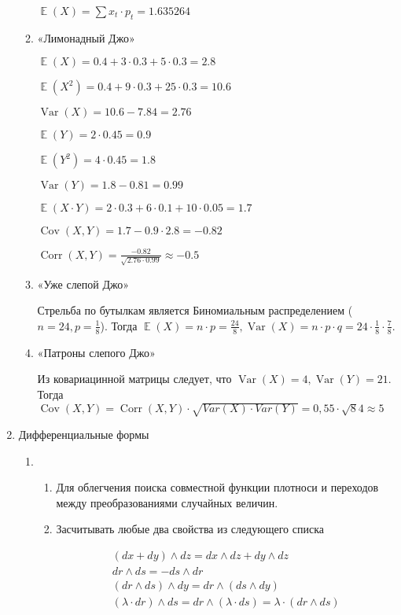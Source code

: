 \documentclass[11pt, a4paper]{article}
\DeclareMathOperator{\Var}{Var}
\DeclareMathOperator{\Cov}{Cov}
\DeclareMathOperator{\Corr}{Corr}
\DeclareMathOperator{\E}{\mathbb{E}}
\theoremstyle{definition}
\begin{document}
\begin{enumerate}
\begin{enumerate}
	$\E(X) = \sum x_t \cdot p_t = 1.635264$
	
    \item «Лимонадный Джо»
    
    $\E(X) = 0.4 + 3 \cdot 0.3 + 5 \cdot 0.3 = 2.8$
    
    $\E(X^2) = 0.4 + 9 \cdot 0.3 + 25 \cdot 0.3 = 10.6$
    
    $\Var(X) = 10.6 - 7.84 = 2.76$
    
    $\E(Y) = 2 \cdot 0.45 = 0.9$
    
    $\E(Y^2) = 4 \cdot 0.45 = 1.8$
    
    $\Var(Y) = 1.8 - 0.81 = 0.99$
    
    $\E(X \cdot Y) = 2 \cdot 0.3 + 6 \cdot 0.1 + 10 \cdot 0.05 = 1.7$
    
    $\Cov(X,Y) = 1.7 - 0.9 \cdot 2.8 = -0.82$
    
    $\Corr(X,Y) = \frac{-0.82}{\sqrt{2.76 \cdot 0.99}} \approx -0.5$
    
    \item «Уже слепой Джо»
    
    Стрельба по бутылкам является Биномиальным распределением ($n=24, p =\frac{1}{8}$).
    Тогда $\E(X)= n \cdot p = \frac{24}{8}, \Var(X) = n \cdot p \cdot q = 24 \cdot \frac{1}{8} \cdot \frac{7}{8}$.
    
    \item «Патроны слепого Джо»
    
    Из ковариацинной матрицы следует, что $\Var(X)=4, \Var(Y)=21$.  Тогда $\Cov(X,Y)=\Corr(X,Y) \cdot \sqrt{Var(X)\cdot Var(Y)} = 0,55 \cdot \sqrt 84 \approx 5$
\end{enumerate}  

    \item Дифференциальные формы
    
\begin{enumerate}
    \item 
    \begin{enumerate}
        \item Для облегчения поиска совместной функции плотноси и переходов между преобразованиями случайных величин.
        
        \item Засчитывать любые два свойства из следующего списка
        
        \[ \begin{array}{l}{(d x+d y) \wedge d z=d x \wedge d z+d y \wedge d z} \\ {d r \wedge d s=-d s \wedge d r} \\ {(d r \wedge d s) \wedge d y=d r \wedge(d s \wedge d y)} \\ {(\lambda \cdot d r) \wedge d s=d r \wedge(\lambda \cdot d s)=\lambda \cdot(d r \wedge d s)}\end{array}
 \]
    \end{enumerate}
    

\end{enumerate}
\end{enumerate}
\end{document}
